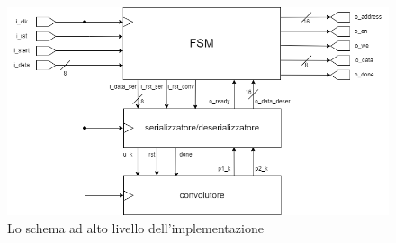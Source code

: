 \documentclass{article}
\begin{document}
\begin{figure}
\centering
\includegraphics[width=1\textwidth]{tmp2.drawio.png}
\caption{\label{fig:tmp2.drawio}Lo schema ad alto livello dell'implementazione}
\end{figure}
\end{document}
